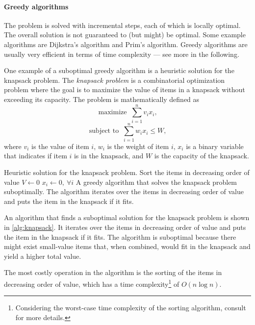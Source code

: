 \paragraph{Greedy algorithms}  The problem is solved with incremental steps, each of which
is locally optimal.  The overall solution is not guaranteed to (but might) be optimal.  Some example
algorithms are Dijkstra's algorithm and Prim's algorithm.  Greedy algorithms are usually
very efficient in terms of time complexity --- see more in the following.

One example of a suboptimal greedy algorithm is a heuristic solution for the knapsack problem.
The \emph{knapsack problem} is a combinatorial optimization problem where the goal is to
maximize the value of items in a knapsack without exceeding its capacity.  The problem is
mathematically defined as
\[
  \text{maximize }~\sum_{i = 1}^n v_i x_i\text{,}
\]
\[
  \text{subject to }~\sum_{i = 1}^n w_i x_i \leq W\text{,}
\]
where $v_i$ is the value of item $i$, $w_i$ is the weight of item $i$, $x_i$ is a binary
variable that indicates if item $i$ is in the knapsack, and $W$ is the capacity of the
knapsack.

\begin{algobox}[label=alg:knapsack]{Heuristic solution for the knapsack problem.}
  Sort the items in decreasing order of value\;
  $V \gets 0$\;
  $x_i \gets 0,~\forall i$\;
  \tcblower
  A greedy algorithm that solves the knapsack problem suboptimally.  The algorithm iterates over
  the items in decreasing order of value and puts the item in the knapsack if it fits.
\end{algobox}

An algorithm that finds a suboptimal solution for the knapsack problem is shown in
\cref{alg:knapsack}.
It iterates over the items in decreasing order of value and puts the item in the
knapsack if it fits.  The algorithm is suboptimal because there might exist small-value
items that, when combined, would fit in the knapsack and yield a higher total value.

The most costly operation in the algorithm is the sorting of the items in
decreasing order of value, which has a time complexity\footnote{%
Considering the worst-case time complexity of the sorting algorithm, consult
 for more details.} of $O(n \log n)$.

